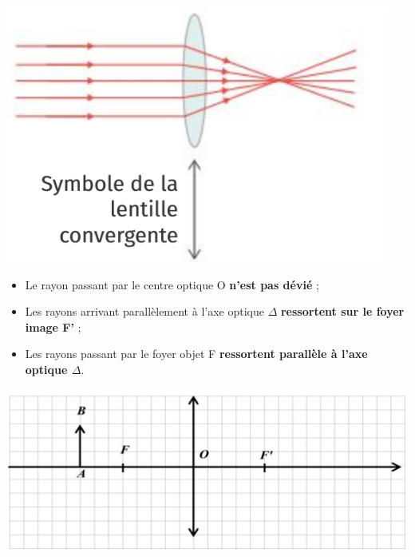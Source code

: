 \begin{tcolorbox}[colback=green!5!white,colframe=green!75!black,title=\textbf{Lentille convergente :}]
\begin{multicols}{2}
    \includegraphics[scale=0.7]{Images/Cours/Chapitre_4/Lentille.PNG}
    
\end{multicols}
\end{tcolorbox}

\begin{tcolorbox}[colback=red!5!white,colframe=red!75!black,title=\textbf{Construction d'une image par une lentille :}]
\begin{itemize}
    \item Le rayon passant par le centre optique O \textbf{n'est pas dévié} ;
    \item Les rayons arrivant parallèlement à l'axe optique $\Delta$ \textbf{ressortent sur le foyer image F'} ;
    \item Les rayons passant par le foyer objet F \textbf{ressortent parallèle à l'axe optique $\Delta$}.
\end{itemize}
\end{tcolorbox}

\begin{center}
    \includegraphics[scale=1]{Images/Cours/Chapitre_4/Lentille_construction_eleve.PNG}
\end{center}

